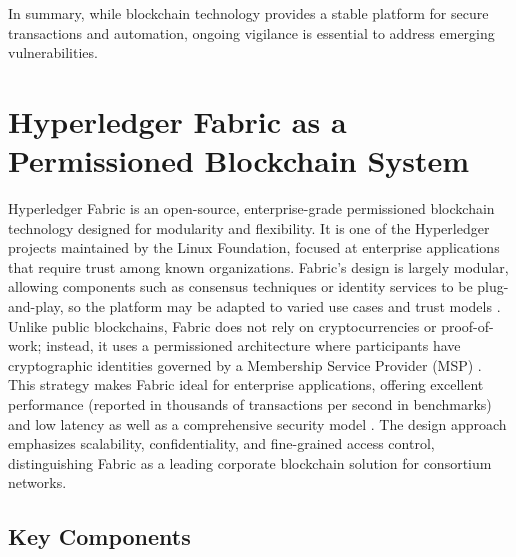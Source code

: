 \documentclass[a4paper,10pt]{report}
\begin{document}
In summary, while blockchain technology provides a stable platform for secure transactions and automation, ongoing vigilance is essential to address emerging vulnerabilities.


\section{Hyperledger Fabric as a Permissioned Blockchain System}

Hyperledger Fabric is an open-source, enterprise-grade permissioned blockchain technology designed for modularity and flexibility.  It is one of the Hyperledger projects maintained by the Linux Foundation, focused at enterprise applications that require trust among known organizations.  Fabric’s design is largely modular, allowing components such as consensus techniques or identity services to be plug-and-play, so the platform may be adapted to varied use cases and trust models \cite{androulaki2018fabric}.  Unlike public blockchains, Fabric does not rely on cryptocurrencies or proof-of-work; instead, it uses a permissioned architecture where participants have cryptographic identities governed by a Membership Service Provider (MSP) \cite{androulaki2018fabric}.  This strategy makes Fabric ideal for enterprise applications, offering excellent performance (reported in thousands of transactions per second in benchmarks) and low latency as well as a comprehensive security model \cite{androulaki2018fabric}.  The design approach emphasizes scalability, confidentiality, and fine-grained access control, distinguishing Fabric as a leading corporate blockchain solution for consortium networks.

\subsection{Key Components}
\end{document}
